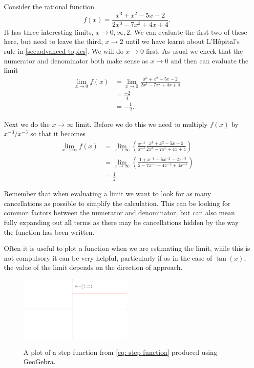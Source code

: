 \begin{ex}
Consider the rational function
\begin{equation*}
f(x)=\frac{x^{3}+x^{2}-5x-2}{2x^{3}-7x^{2}+4x+4}.
\end{equation*}
It has three interesting limits, $x\to 0,\infty,2$. We can evaluate the first two of these here, but need to leave the third, $x\to 2$ until we have learnt about L'H\^{o}pital's rule in \cref{sec:advanced topics}. We will do $x\to 0$ first. As usual we check that the numerator and denominator both make sense as $x\to 0$ and then can evaluate the limit
\begin{align*}
\lim_{x\to 0}f(x)&=\lim_{x\to 0}\frac{x^{3}+x^{2}-5x-2}{2x^{3}-7x^{2}+4x+4}\\
&=\frac{-2}{4}\\
&=-\frac{1}{2}.
\end{align*}

Next we do the $x\to \infty$ limit.  Before we do this we need to multiply $f(x)$ by $x^{-3}/x^{-3}$ so that it becomes
\begin{align*}
\lim_{x\to \infty}f(x)	&=\lim_{x\to \infty}\left(\frac{x^{-3}}{x^{-3}}\frac{x^{3}+x^{2}-5x-2}{2x^{3}-7x^{2}+4x+4}\right)\\
				&=\lim_{x\to \infty}\left(\frac{1+x^{-1}-5x^{-2}-2x^{-3}}{2-7x^{-1}+4x^{-2}+4x^{-3}}\right)\\
				&=\frac{1}{2}.
\end{align*}
\end{ex}

Remember that when evaluating a limit we want to look for as many cancellations as possible to simplify the calculation. This can be looking for common factors between the numerator and denominator, but can also mean fully expanding out all terms as there may be cancellations hidden by the way the function has been written.

Often it is useful to plot a function when we are estimating the limit, while this is not compulsory it can be very helpful, particularly if as in the case of $\tan(x)$, the value of the limit depends on the direction of approach.\\

\begin{figure}[ht]
    \centering
  \includegraphics[width=0.5\textwidth,alt={A plot of a step function.}]{figures/step_function}
    \caption{A plot of a step function from \cref{eq: step function} produced using GeoGebra.}
\label{fig: step function}
\end{figure}

